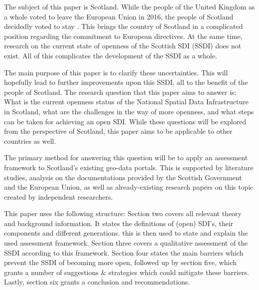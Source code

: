 %
The subject of this paper is Scotland. While the people of the United Kingdom as a whole voted to leave the European Union in 2016, the people of Scotland decidedly voted to stay \citep{brexit}. This brings the country of Scotland in a complicated position regarding the commitment to European directives. At the same time, research on the current state of openness of the Scottish SDI (SSDI) does not exist. All of this complicates the development of the SSDI as a whole. 


The main purpose of this paper is to clarify these uncertainties. This will hopefully lead to further improvements upon this SSDI, all to the benefit of the people of Scotland. The research question that this paper aims to answer is: What is the current openness status of the National Spatial Data Infrastructure in Scotland, what are the challenges in the way of more openness, and what steps can be taken for achieving an open SDI. While these questions will be explored from the perspective of Scotland, this paper aims to be applicable to other countries as well. 


The primary method for answering this question will be to apply an assessment framework to Scotland's existing geo-data portals. This is supported by literature studies, analysis on the documentations provided by the Scottish Government and the European Union, as well as already-existing research papers on this topic created by independent researchers.


This paper uses the following structure: Section two covers all relevant theory and background information. It states the definitions of (open) SDI's, their components and different generations. this is then used to state and explain the used assessment framework. Section three covers a qualitative assessment of the SSDI according to this framework. Section four states the main barriers which prevent the SSDI of becoming more open, followed up by section five, which grants a number of suggestions \& strategies which could mitigate these barriers. Lastly, section six grants a conclusion and recommendations.